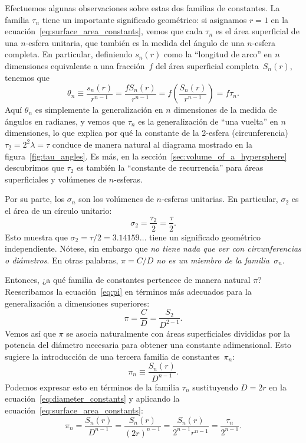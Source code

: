 Efectuemos algunas observaciones sobre estas dos familias de constantes. La familia $\tau_n$ tiene un importante significado geométrico: si asignamos $r=1$ en la ecuación~\eqref{eq:surface_area_constants}, vemos que cada $\tau_n$ es el área superficial de una $n$-esfera unitaria, que también es la medida del ángulo de una $n$-esfera completa. En particular, definiendo $s_n(r)$ como la ``longitud de arco'' en $n$ dimensiones equivalente a una fracción~$f$ del área superficial completa~$S_n(r)$, tenemos que
\[
\theta_n \equiv \frac{s_n(r)}{r^{n-1}} = \frac{f S_n(r)}{r^{n-1}} = f\left(\frac{S_n(r)}{r^{n-1}}\right) = f\tau_n.
\]
Aquí $\theta_n$ es simplemente la generalización en $n$ dimensiones de la medida de ángulos en radianes, y vemos que $\tau_n$ es la generalización de ``una vuelta'' en $n$ dimensiones, lo que explica por qué la constante de la 2-esfera (circunferencia) $\tau_2 = 2^2\lambda = \tau$ conduce de manera natural al diagrama mostrado en la figura~\ref{fig:tau_angles}. Es más, en la sección~\ref{sec:volume_of_a_hypersphere} descubrimos que $\tau_2$ es también la ``constante de recurrencia'' para áreas superficiales y volúmenes de $n$-esferas.

Por su parte, los $\sigma_n$ son los volúmenes de $n$-esferas unitarias. En particular, $\sigma_2$ es el área de un círculo unitario:
\[
\sigma_2 = \frac{\tau_2}{2} = \frac{\tau}{2}.
\]
Esto muestra que $\sigma_2 = \tau/2 = 3.14159\ldots$ tiene un significado geométrico independiente. Nótese, sin embargo que \emph{no tiene nada que ver con circunferencias o diámetros}. En otras palabras, \emph{$\pi = C/D$ no es un miembro de la familia~$\sigma_n$}.

Entonces, ¿a qué familia de constantes pertenece de manera natural $\pi$?
Reescribamos la ecuación~\eqref{eq:pi} en términos más adecuados para la generalización a dimensiones superiores:
\[
\pi = \frac{C}{D} = \frac{S_2}{D^{2-1}}.
\]
Vemos así que $\pi$ se asocia naturalmente con áreas superficiales divididas por la potencia del diámetro necesaria para obtener una constante adimensional. Esto sugiere la introducción de una tercera familia de constantes~$\pi_n$:
\begin{equation}
\label{eq:diameter_constants}
\pi_n \equiv \frac{S_n(r)}{D^{n-1}}.
\end{equation}
Podemos expresar esto en términos de la familia $\tau_n$ sustituyendo $D = 2r$ en la ecuación~\eqref{eq:diameter_constants} y aplicando la ecuación~\eqref{eq:surface_area_constants}:
\[
\pi_n = \frac{S_n(r)}{D^{n-1}} = \frac{S_n(r)}{(2r)^{n-1}} =
\frac{S_n(r)}{2^{n-1}r^{n-1}} = \frac{\tau_n}{2^{n-1}}.
\]

